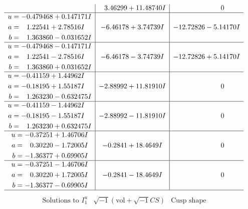 \documentclass[1p]{elsarticle_modified}
\theoremstyle{definition}
\newcommand{\I}{\sqrt{-1}}
\begin{document}
$$\begin{array}{c|c|c}
 & \phantom{-}3.46299 + 11.48740 I & \phantom{-0.000000 } 0 \\ \hline\begin{aligned}
u &= -0.479468 + 0.147171 I \\
a &= \phantom{-}1.22541 + 2.78516 I \\
b &= \phantom{-}1.363860 - 0.031652 I\end{aligned}
 & -6.46178 + 3.74739 I & -12.72826 - 5.14170 I \\ \hline\begin{aligned}
u &= -0.479468 - 0.147171 I \\
a &= \phantom{-}1.22541 - 2.78516 I \\
b &= \phantom{-}1.363860 + 0.031652 I\end{aligned}
 & -6.46178 - 3.74739 I & -12.72826 + 5.14170 I \\ \hline\begin{aligned}
u &= -0.41159 + 1.44962 I \\
a &= -0.18195 + 1.55187 I \\
b &= \phantom{-}1.263230 - 0.632475 I\end{aligned}
 & -2.88992 + 11.81910 I & \phantom{-0.000000 } 0 \\ \hline\begin{aligned}
u &= -0.41159 - 1.44962 I \\
a &= -0.18195 - 1.55187 I \\
b &= \phantom{-}1.263230 + 0.632475 I\end{aligned}
 & -2.88992 - 11.81910 I & \phantom{-0.000000 } 0 \\ \hline\begin{aligned}
u &= -0.37251 + 1.46706 I \\
a &= \phantom{-}0.30220 - 1.72005 I \\
b &= -1.36377 + 0.69905 I\end{aligned}
 & -0.2841 + 18.4649 I & \phantom{-0.000000 } 0 \\ \hline\begin{aligned}
u &= -0.37251 - 1.46706 I \\
a &= \phantom{-}0.30220 + 1.72005 I \\
b &= -1.36377 - 0.69905 I\end{aligned}
 & -0.2841 - 18.4649 I & \phantom{-0.000000 } 0\\
 \hline 
 \end{array}$$\newpage$$\begin{array}{c|c|c}  
\text{Solutions to }I^u_{1}& \I (\text{vol} + \sqrt{-1}CS) & \text{Cusp shape}\\

\end{array}$$
\end{document}
